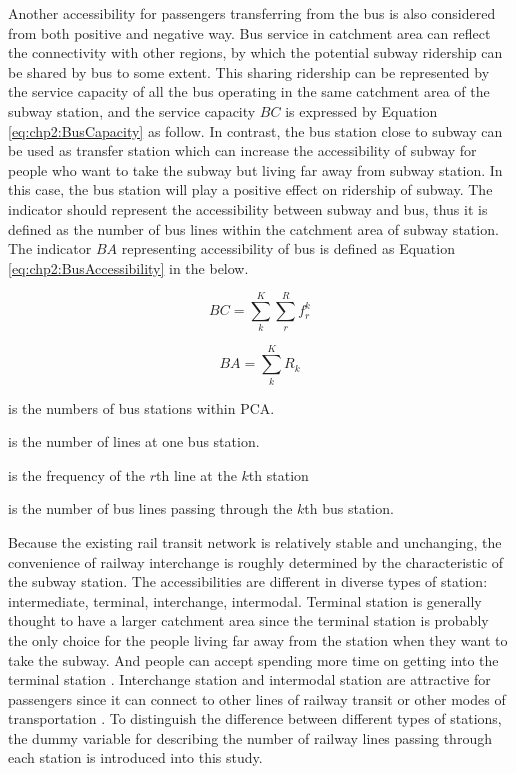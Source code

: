 %
Another accessibility for passengers transferring from the bus is also considered from both positive and negative way. Bus service in catchment area can reflect the connectivity with other regions, by which the potential subway ridership can be shared by bus to some extent. This sharing ridership can be represented by the service capacity of all the bus operating in the same catchment area of the subway station, and the service capacity $BC$ is expressed by Equation \ref{eq:chp2:BusCapacity} as follow. In contrast, the bus station close to subway can be used as transfer station which can increase the accessibility of subway for people who want to take the subway but living far away from subway station. In this case, the bus station will play a positive effect on ridership of subway. The indicator should represent the accessibility between subway and bus, thus it is defined as the number of bus lines within the catchment area of subway station. The indicator $BA$ representing accessibility of bus is defined as Equation \ref{eq:chp2:BusAccessibility} in the below.

\begin{equation}
BC=\sum_{k}^{K}\sum_{r}^{R}f_{r}^{k}
\label{eq:chp2:BusCapacity}
\end{equation}

\begin{equation}
BA=\sum_{k}^{K}R_{k}
\label{eq:chp2:BusAccessibility}
\end{equation}

\begin{description}
	\setlength{\parskip}{0\baselineskip} %
	\normalsize
	\item[\textbf{Where:}]
	\item[$K$] is the numbers of bus stations within PCA.
	\item[$R$] is the number of lines at one bus station.
	\item[$f_{r}^{k}$] is the frequency of the $r$th line at the $k$th station
	\item[$R_k$] is the number of bus lines passing through the $k$th bus station.
	\setlength{\parskip}{0.7\baselineskip} %
\end{description}

%
Because the existing rail transit network is relatively stable and unchanging, the convenience of railway interchange is roughly determined by the characteristic of the subway station. The accessibilities are different in diverse types of station: intermediate, terminal, interchange, intermodal. Terminal station is generally thought to have a larger catchment area since the terminal station is probably the only choice for the people living far away from the station when they want to take the subway. And people can accept spending more time on getting into the terminal station \cite{o1996walking}. Interchange station and intermodal station are attractive for passengers since it can connect to other lines of railway transit or other modes of transportation \cite{kuby2004factors}. To distinguish the difference between different types of stations, the dummy variable for describing the number of railway lines passing through each station is introduced into this study.

